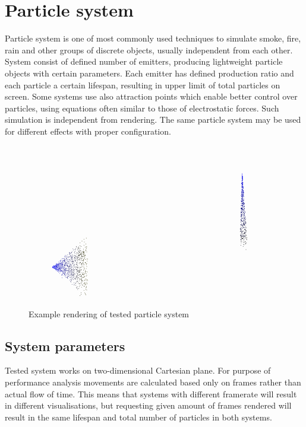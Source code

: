 \chapter{Particle system}
\label{cha:particlesystem}

Particle system is one of most commonly used techniques to simulate smoke, fire, rain and other groups of discrete objects, usually independent from each other. System consist of defined number of emitters, producing lightweight particle objects with certain parameters. Each emitter has defined production ratio and each particle a certain lifespan, resulting in upper limit of total particles on screen. Some systems use also attraction points which enable better control over particles, using equations often similar to those of electrostatic forces.
Such simulation is independent from rendering. The same particle system may be used for different effects with proper configuration.

\begin{figure}[h!]
  \caption{Example rendering of tested particle system}
  \label{img:particles}
  \centering
	\includegraphics[width=16cm]{particles}
\end{figure}

\section{System parameters}
\label{sec:emittersparameters}

Tested system works on two-dimensional Cartesian plane. For purpose of  performance analysis movements are calculated based only on frames rather than actual flow of time. This means that systems with different framerate will result in different visualisations, but requesting given amount of frames rendered will result in the same lifespan and total number of particles in both systems.

